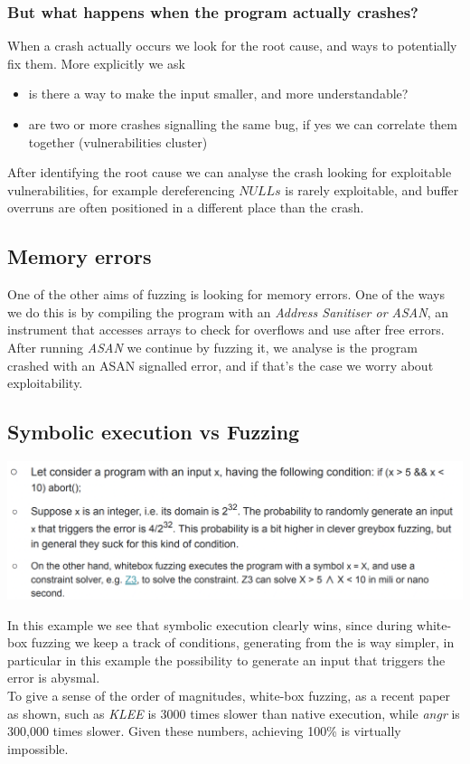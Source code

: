 \documentclass[11pt, oneside]{article}   	%
\begin{document}
 \subsubsection*{But what happens when the program actually crashes?}
 When a crash actually occurs we look for the root cause, and ways to potentially fix them. More explicitly we ask
 \begin{itemize}
 \item is there a way to make the input smaller, and more understandable?
 \item are two or more crashes signalling the same bug, if yes we can correlate them together (vulnerabilities cluster)
 \end{itemize}
 After identifying the root cause we can analyse the crash looking for exploitable vulnerabilities, for example dereferencing $NULLs$ is rarely exploitable, and buffer overruns are often positioned in a different place than the crash. 
 
 \subsection*{Memory errors}
 One of the other aims of fuzzing is looking for memory errors. One of the ways we do this is by compiling the program with an \emph{Address Sanitiser or ASAN}, an instrument that accesses arrays to check for overflows and use after free errors. \\
 After running \emph{ASAN} we continue by fuzzing it, we analyse is the program crashed with an ASAN signalled error, and if that's the case we worry about exploitability.
 
\subsection*{Symbolic execution vs Fuzzing}
\begin{center}
\includegraphics[scale = 0.4]{sf}
\end{center}
In this example we see that symbolic execution clearly wins, since during white-box fuzzing we keep a track of conditions, generating from the is way simpler, in particular in this example the possibility to generate an input that triggers the error is abysmal. \\
To give a sense of the order of magnitudes, white-box fuzzing, as a recent paper as shown, such as \emph{KLEE} is 3000 times slower than native execution, while \emph{angr} is 300,000 times slower. Given these numbers, achieving 100\% is virtually impossible.
\end{document}
